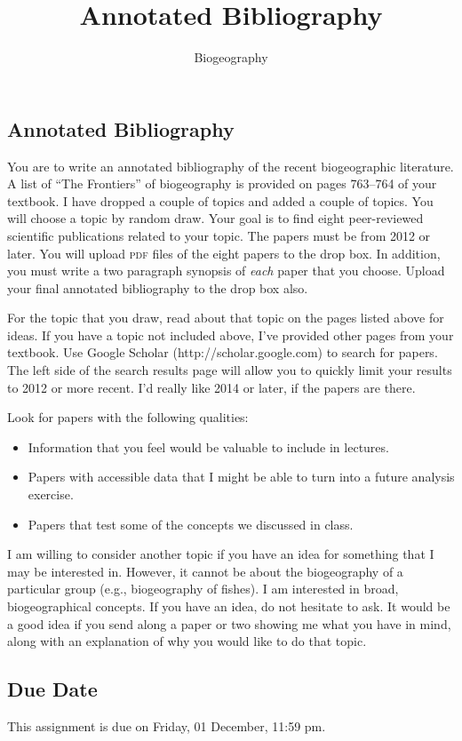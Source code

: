 \documentclass[12pt]{article}
\title{Annotated Bibliography}
\author{Biogeography}
\date{}                                           %
\begin{document}
\thispagestyle{plain}



\subsection*{Annotated Bibliography}

You are to write an annotated bibliography of the recent biogeographic literature. A list of ``The Frontiers'' of biogeography is provided on pages 763--764 of your textbook.  I have dropped a couple of topics and added a couple of topics. You will choose a topic by random draw. Your goal is to find eight peer-reviewed scientific publications related to your topic.  The papers must be from 2012 or later.  You will upload \textsc{pdf} files of the eight papers to the drop box. In addition, you must write a two paragraph synopsis of \textit{each} paper that you choose. Upload your final annotated bibliography to the drop box also.

For the topic that you draw, read about that topic on the pages listed above for ideas. If you have a topic not included above, I've provided other pages from your textbook. Use Google Scholar (http://scholar.google.com) to search for papers. The left side of the search results page will allow you to quickly limit your results to 2012 or more recent.  I'd really like 2014 or later, if the papers are there.

Look for papers with the following qualities:

\begin{itemize}

\item Information that you feel would be valuable to include in lectures.

\item Papers with accessible data that I might be able to turn into a future analysis exercise.

\item Papers that test some of the concepts we discussed in class.

\end{itemize}

I am willing to consider another topic if you have an idea for something that I may be interested in. However, it cannot be about the biogeography of a particular group (e.g., biogeography of fishes). I am interested in broad, biogeographical concepts.  If you have an idea, do not hesitate to ask. It would be a good idea if you send along a paper or two showing me what you have in mind, along with an explanation of why you would like to do that topic.

\subsection*{Due Date}

This assignment is due on Friday, 01 December, 11:59 pm.
\end{document}

